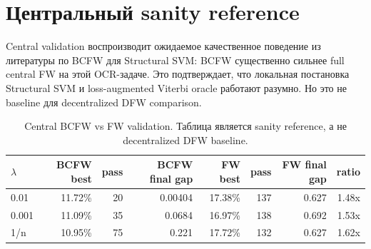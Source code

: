 \documentclass[11pt,a4paper]{article}
\begin{document}
\begin{table}[htbp]
\centering
\caption{Decentralized DBCFW vs DFW, matching по ближайшему training-oracle budget. Чем ниже test error, тем лучше.}
\label{tab:decentralized}
\end{table}

\section{Центральный sanity reference}

Central validation воспроизводит ожидаемое качественное поведение из литературы по BCFW для Structural SVM: BCFW существенно сильнее full central FW на этой OCR-задаче. Это подтверждает, что локальная постановка Structural SVM и loss-augmented Viterbi oracle работают разумно. Но это не baseline для decentralized DFW comparison.

\begin{table}[htbp]
\centering
\caption{Central BCFW vs FW validation. Таблица является sanity reference, а не decentralized DFW baseline.}
\begin{tabular}{lrrrrrrr}
\toprule
\(\lambda\) & BCFW best & pass & BCFW final gap & FW best & pass & FW final gap & ratio \\
\midrule
0.01  & 11.72\% & 20 & 0.00404 & 17.38\% & 137 & 0.627 & 1.48x \\
0.001 & 11.09\% & 35 & 0.0684  & 16.97\% & 138 & 0.692 & 1.53x \\
1/n   & 10.95\% & 75 & 0.221   & 17.72\% & 132 & 0.627 & 1.62x \\
\bottomrule
\end{tabular}
\label{tab:central}
\end{table}
\end{document}
